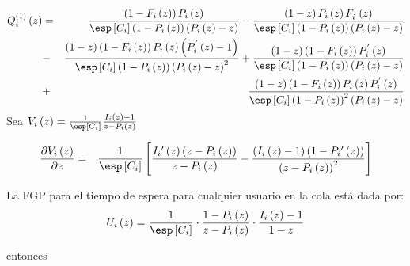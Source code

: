 \begin{eqnarray*}
Q_{i}^{(1)}\left(z\right)&=& \frac{\left(1-F_{i}\left(z\right)\right)P_{i}\left(z\right)}{\esp\left[C_{i}\right]\left(1-P_{i}\left(z\right)\right)\left(P_{i}\left(z\right)-z\right)}
-\frac{\left(1-z\right)P_{i}\left(z\right)F_{i}^{'}\left(z\right)}{\esp\left[C_{i}\right]\left(1-P_{i}\left(z\right)\right)\left(P_{i}\left(z\right)-z\right)}\\
&-&\frac{\left(1-z\right)\left(1-F_{i}\left(z\right)\right)P_{i}\left(z\right)\left(P_{i}^{'}\left(z\right)-1\right)}{\esp\left[C_{i}\right]\left(1-P_{i}\left(z\right)\right)\left(P_{i}\left(z\right)-z\right)^{2}}+\frac{\left(1-z\right)\left(1-F_{i}\left(z\right)\right)P_{i}^{'}\left(z\right)}{\esp\left[C_{i}\right]\left(1-P_{i}\left(z\right)\right)\left(P_{i}\left(z\right)-z\right)}\\
&+&\frac{\left(1-z\right)\left(1-F_{i}\left(z\right)\right)P_{i}\left(z\right)P_{i}^{'}\left(z\right)}{\esp\left[C_{i}\right]\left(1-P_{i}\left(z\right)\right)^{2}\left(P_{i}\left(z\right)-z\right)}
\end{eqnarray*}
Sea
$V_{i}\left(z\right)=\frac{1}{\esp\left[C_{i}\right]}\frac{I_{i}\left(z\right)-1}{z-P_{i}\left(z\right)}$


\begin{eqnarray*}
\frac{\partial V_{i}\left(z\right)}{\partial z}&=&\frac{1}{\esp\left[C_{i}\right]}\left[\frac{I_{i}{'}\left(z\right)\left(z-P_{i}\left(z\right)\right)}{z-P_{i}\left(z\right)}-\frac{\left(I_{i}\left(z\right)-1\right)\left(1-P_{i}{'}\left(z\right)\right)}{\left(z-P_{i}\left(z\right)\right)^{2}}\right]
\end{eqnarray*}


La FGP para el tiempo de espera para cualquier usuario en la cola est\'a dada por:
\[U_{i}\left(z\right)=\frac{1}{\esp\left[C_{i}\right]}\cdot\frac{1-P_{i}\left(z\right)}{z-P_{i}\left(z\right)}\cdot\frac{I_{i}\left(z\right)-1}{1-z}\]

entonces


